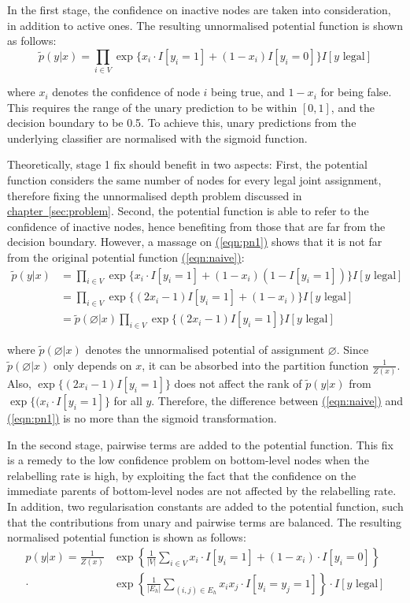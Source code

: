 \documentclass[11pt,a4paper]{book}
\begin{document}
In the first stage, the confidence on inactive nodes are taken into consideration, in addition to active ones. The resulting unnormalised potential function is shown as follows:
\begin{equation}
\tilde{p}(y|x)=\prod_{i\in V}\exp\{x_i\cdot I[y_i=1]+(1-x_i)I[y_i=0]\}I[y\text{ legal}]
\label{eqn:pn1}
\end{equation}

where $x_i$ denotes the confidence of node $i$ being true, and $1-x_i$ for being false. This requires the range of the unary prediction to be within $[0,1]$, and the decision boundary to be 0.5. To achieve this, unary predictions from the underlying classifier are normalised with the sigmoid function.

Theoretically, stage 1 fix should benefit in two aspects: First, the potential function considers the same number of nodes for every legal joint assignment, therefore fixing the unnormalised depth problem discussed in \hyperref[sec:problem]{chapter~\ref{sec:problem}}. Second, the potential function is able to refer to the confidence of inactive nodes, hence benefiting from those that are far from the decision boundary. However, a massage on \hyperref[eqn:pn1]{(\ref{eqn:pn1})} shows that it is not far from the original potential function \hyperref[eqn:naive]{(\ref{eqn:naive})}:
\begin{align}
\tilde{p}(y|x)&=\prod_{i\in V}\exp\{x_i\cdot I[y_i=1]+(1-x_i)(1-I[y_i=1])\}I[y\text{ legal}]\nonumber\\
&=\prod_{i\in V}\exp\{(2x_i-1)I[y_i=1]+(1-x_i)\}I[y\text{ legal}]\nonumber\\
&=\tilde{p}(\varnothing|x)\prod_{i\in V}\exp\{(2x_i-1)I[y_i=1]\}I[y\text{ legal}]
\label{eqn:pn2}
\end{align}

where $\tilde{p}(\varnothing|x)$ denotes the unnormalised potential of assignment $\varnothing$. Since $\tilde{p}(\varnothing|x)$ only depends on $x$, it can be absorbed into the partition function $\frac{1}{Z(x)}$. Also, $\exp\{(2x_i-1)I[y_i=1]\}$ does not affect the rank of $\tilde{p}(y|x)$ from $\exp\{(x_i\cdot I[y_i=1]\}$ for all $y$. Therefore, the difference between \hyperref[eqn:naive]{(\ref{eqn:naive})} and \hyperref[eqn:pn1]{(\ref{eqn:pn1})} is no more than the sigmoid transformation.

In the second stage, pairwise terms are added to the potential function. This fix is a remedy to the low confidence problem on bottom-level nodes when the relabelling rate is high, by exploiting the fact that the confidence on the immediate parents of bottom-level nodes are not affected by the relabelling rate. In addition, two regularisation constants are added to the potential function, such that the contributions from unary and pairwise terms are balanced. The resulting normalised potential function is shown as follows:
\begin{align}
p(y|x)=\frac{1}{Z(x)}&\exp\left\{\frac{1}{|V|}\sum_{i\in V}x_i\cdot I[y_i=1]+(1-x_i)\cdot I[y_i=0]\right\}\nonumber\\
\cdot&\exp\left\{\frac{1}{|E_h|}\sum_{(i,j)\in E_h}x_ix_j\cdot I[y_i=y_j=1]\right\}\cdot I[y\text{ legal}]
\end{align}
\end{document}
